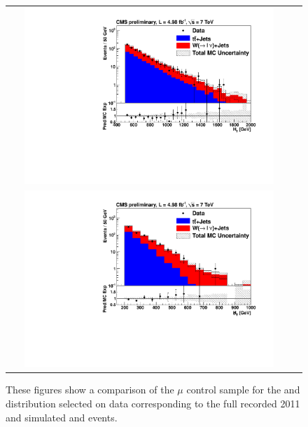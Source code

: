 \begin{figure}[tbhn]
\begin{center}
\begin{tabular}{cc}
\includegraphics[width=0.9\textwidth]{lostlepton/plots/ANplots/Control_HT.pdf}\\
\includegraphics[width=0.9\textwidth]{lostlepton/plots/ANplots/Control_MHT.pdf}
\end{tabular}
\end{center}
\caption{These figures show a comparison of the $\mu$ control sample for the \HT and \MHT distribution selected on data corresponding to the full \lumi recorded 2011 and simulated \ttbar and \wpj events.}

\end{figure}



